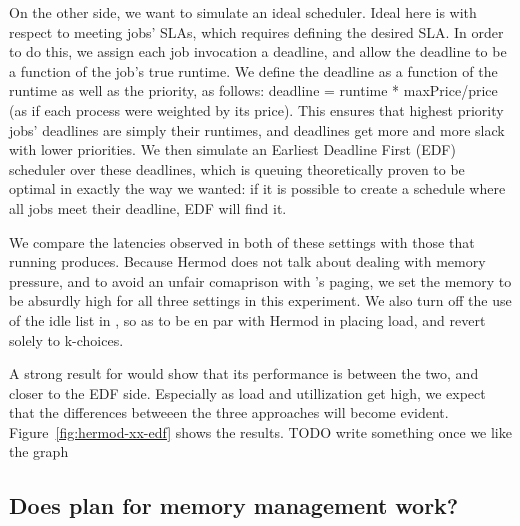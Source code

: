On the other side, we want to simulate an ideal scheduler. Ideal here is with
respect to meeting jobs' SLAs, which requires defining the desired SLA. In order
to do this, we assign each job invocation a deadline, and allow the deadline to
be a function of the job's true runtime. We define the deadline as a function of
the runtime as well as the priority, as follows: deadline = runtime *
maxPrice/price (as if each process were weighted by its price). This ensures
that highest priority jobs' deadlines are simply their runtimes, and deadlines
get more and more slack with lower priorities. We then simulate an Earliest
Deadline First (EDF) scheduler over these deadlines, which is queuing
theoretically proven to be optimal in exactly the way we wanted: if it is
possible to create a schedule where all jobs meet their deadline, EDF will find
it\cite{TODO}.

We compare the latencies observed in both of these settings with those that
running \sys{} produces. Because Hermod does not talk about dealing with memory
pressure, and to avoid an unfair comaprison with \sys{}'s paging, we set the
memory to be absurdly high for all three settings in this experiment. We also
turn off the use of the idle list in \sys{}, so as to be en par with Hermod in
placing load, and revert solely to k-choices.

A strong result for \sys{} would show that its performance is between the two,
and closer to the EDF side. Especially as load and utillization get high, we
expect that the differences betweeen the three approaches will become evident.
Figure~\ref{fig:hermod-xx-edf} shows the results. TODO write something once we
like the graph


\subsection{Does \sys{} plan for memory management work?}

